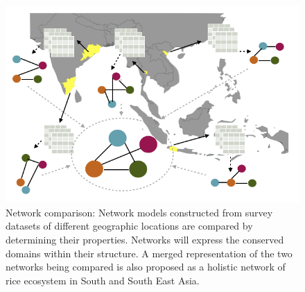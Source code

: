 \newpage
\begin{landscape}
\begin{figure}[h!]
\centering
\includegraphics[width=6in]{wholenet}

\caption[Network comparison]{Network comparison: Network models constructed from survey datasets of different geographic locations are compared by determining their properties. Networks will express the conserved domains within their structure. A merged representation of the two networks being compared is also proposed as a holistic network of rice ecosystem in South and South East Asia.}
\label{fig:wholenet}
\end{figure}
\end{landscape}



